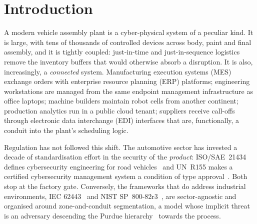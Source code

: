 %

\section{Introduction}

A modern vehicle assembly plant is a cyber-physical system of a peculiar kind.
It is large, with tens of thousands of controlled devices across body, paint
and final assembly, and it is tightly coupled: just-in-time and just-in-sequence
logistics remove the inventory buffers that would otherwise absorb a
disruption. It is also, increasingly, a \emph{connected} system. Manufacturing
execution systems (MES) exchange orders with enterprise resource planning (ERP)
platforms; engineering workstations are managed from the same endpoint
management infrastructure as office laptops; machine builders maintain robot
cells from another continent; production analytics run in a public cloud
tenant; suppliers receive call-offs through electronic data interchange (EDI)
interfaces that are, functionally, a conduit into the plant's scheduling logic.

Regulation has not followed this shift. The automotive sector has invested a
decade of standardisation effort in the security of the \emph{product}:
ISO/SAE~21434 defines cybersecurity engineering for road
vehicles~\cite{isosae21434} and UN~R155 makes a certified cybersecurity
management system a condition of type approval~\cite{unr155}. Both stop at the
factory gate. Conversely, the frameworks that do address industrial
environments, IEC 62443~\cite{iec624433302020,iec624433303} and NIST
SP~800-82r3~\cite{nist80082r3}, are sector-agnostic and organised around
zone-and-conduit segmentation, a model whose implicit threat is an adversary
descending the Purdue hierarchy~\cite{williams1994purdue} towards the process.

